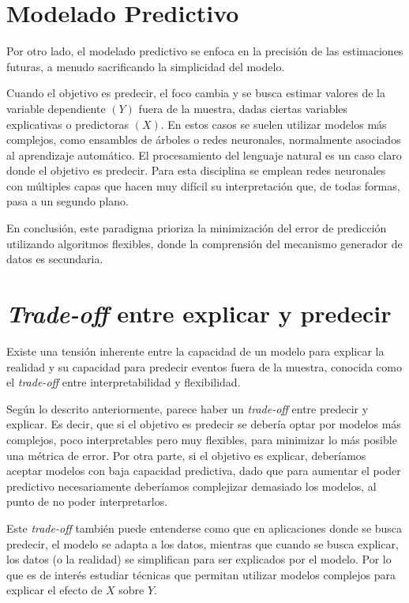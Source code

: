 \section{Modelado Predictivo}

Por otro lado, el modelado predictivo se enfoca en la precisión de las estimaciones futuras, a menudo sacrificando la simplicidad del modelo.

Cuando el objetivo es predecir, el foco cambia y se busca estimar valores de la variable dependiente $(Y)$ fuera de la muestra, dadas ciertas variables explicativas o predictoras $(X)$. En estos casos se suelen utilizar modelos más complejos, como ensambles de árboles o redes neuronales, normalmente asociados al aprendizaje automático. El procesamiento del lenguaje natural es un caso claro donde el objetivo es predecir. Para esta disciplina se emplean redes neuronales con múltiples capas que hacen muy difícil su interpretación que, de todas formas, pasa a un segundo plano.

En conclusión, este paradigma prioriza la minimización del error de predicción utilizando algoritmos flexibles, donde la comprensión del mecanismo generador de datos es secundaria.

\section{\textit{Trade-off} entre explicar y predecir}

Existe una tensión inherente entre la capacidad de un modelo para explicar la realidad y su capacidad para predecir eventos fuera de la muestra, conocida como el \textit{trade-off} entre interpretabilidad y flexibilidad.

Según lo descrito anteriormente, parece haber un \textit{trade-off} entre predecir y explicar. Es decir, que si el objetivo es predecir se debería optar por modelos más complejos, poco interpretables pero muy flexibles, para minimizar lo más posible una métrica de error. Por otra parte, si el objetivo es explicar, deberíamos aceptar modelos con baja capacidad predictiva, dado que para aumentar el poder predictivo necesariamente deberíamos complejizar demasiado los modelos, al punto de no poder interpretarlos.

Este \textit{trade-off} también puede entenderse como que en aplicaciones donde se busca predecir, el modelo se adapta a los datos, mientras que cuando se busca explicar, los datos (o la realidad) se simplifican para ser explicados por el modelo. Por lo que es de interés estudiar técnicas que permitan utilizar modelos complejos para explicar el efecto de $X$ sobre $Y$.

